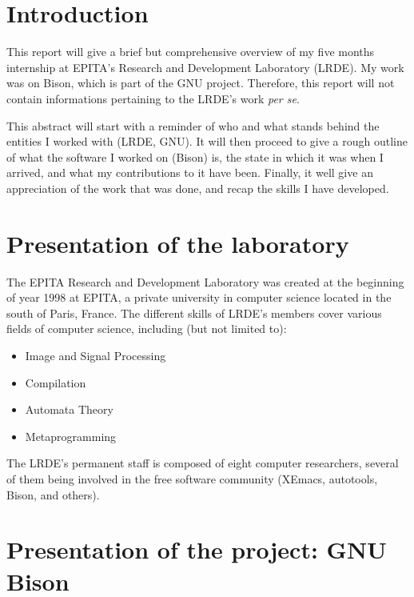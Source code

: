\documentclass[a4paper,11pt,final]{article}
\begin{document}
  \sloppy
  \setcounter{page}{1}
  \section*{Introduction}

  This report will give a brief but comprehensive overview of my five months
  internship at EPITA's Research and Development Laboratory (LRDE).  My work
  was on Bison, which is part of the GNU project.  Therefore, this report will
  not contain informations pertaining to the LRDE's work \textit{per se}.

  This abstract will start with a reminder of who and what stands behind the
  entities I worked with (LRDE, GNU). It will then proceed to give a rough
  outline of what the software I worked on (Bison) is, the state in which it
  was when I arrived, and what my contributions to it have been. Finally, it
  well give an appreciation of the work that was done, and recap the skills I
  have developed.

  \section*{Presentation of the laboratory}

  The EPITA Research and Development Laboratory was created at the
  beginning of year 1998 at EPITA, a private university in computer science
  located in the south of Paris, France. The different skills of LRDE's members
  cover various fields of computer science, including (but not limited to):

  \begin{itemize}
    \item Image and Signal Processing
    \item Compilation
    \item Automata Theory
    \item Metaprogramming
  \end{itemize}

  The LRDE's permanent staff is composed of eight computer researchers, several
  of them being involved in the free software community (XEmacs, autotools,
  Bison, and others).

  \section*{Presentation of the project: GNU Bison}
\end{document}
